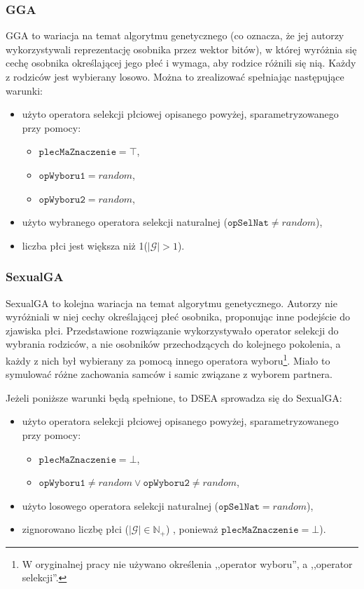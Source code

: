 \documentclass[twoside]{iisthesis}
\newcommand{\numberSet}[1]{\mathbb{#1}}
\newcommand{\important}[1]{\mathcal{#1}}
\newcommand{\param}[1]{\mathtt{#1}}
\begin{document}
\subsubsection{GGA}

GGA \cite{GGA} to wariacja na temat algorytmu genetycznego (co oznacza, że jej autorzy wykorzystywali reprezentację osobnika przez wektor bitów), w której wyróżnia się cechę osobnika określającej jego płeć i wymaga, aby rodzice różnili się nią. Każdy z rodziców jest wybierany losowo. Można to zrealizować spełniając następujące warunki:
\begin{itemize}
	\item użyto operatora selekcji płciowej opisanego powyżej, sparametryzowanego przy pomocy:
	\begin{itemize}
		\item $\param{plecMaZnaczenie} = \top$,
		\item $\param{opWyboru1} = random$,
		\item $\param{opWyboru2} = random$,
	\end{itemize}
	\item użyto wybranego operatora selekcji naturalnej ($\param{opSelNat} \neq random$),
	\item liczba płci jest większa niż 1($|\important{G}| > 1$).
\end{itemize}

\subsubsection{SexualGA}

SexualGA \cite{SexualGA} to kolejna wariacja na temat algorytmu genetycznego. Autorzy nie wyróżniali w niej cechy określającej płeć osobnika, proponując inne podejście do zjawiska płci. Przedstawione rozwiązanie wykorzystywało operator selekcji do wybrania rodziców, a nie osobników przechodzących do kolejnego pokolenia, a każdy z nich był wybierany za pomocą innego operatora wyboru\footnote{
	W oryginalnej pracy nie używano określenia ,,operator wyboru'', a ,,operator selekcji''.
}. Miało to symulować różne zachowania samców i samic związane z wyborem partnera.

Jeżeli poniższe warunki będą spełnione, to DSEA sprowadza się do SexualGA:
\begin{itemize}
	\item użyto operatora selekcji płciowej opisanego powyżej, sparametryzowanego przy pomocy:
	\begin{itemize}
		\item $\param{plecMaZnaczenie} = \bot$,
		\item $\param{opWyboru1} \neq random \vee \param{opWyboru2} \neq random$,
	\end{itemize}
	\item użyto losowego operatora selekcji naturalnej ($\param{opSelNat} = random$),
	\item zignorowano liczbę płci ($|\important{G}| \in \numberSet{N}_{+}$) , ponieważ $\param{plecMaZnaczenie} = \bot$).
\end{itemize}
\end{document}

